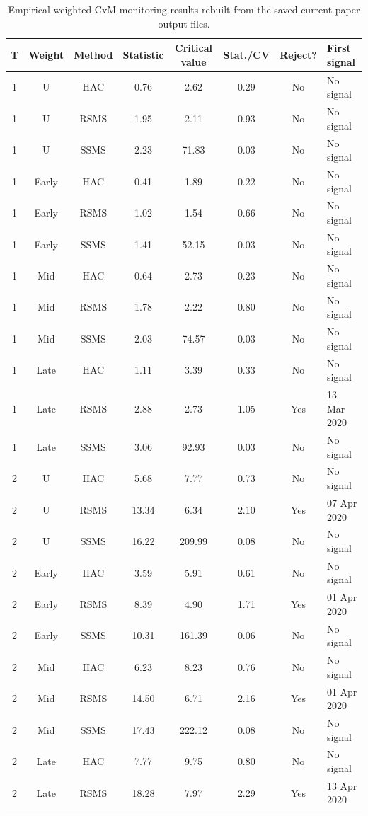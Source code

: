 \begin{table}[htbp]
\centering
\scriptsize
\caption{Empirical weighted-CvM monitoring results rebuilt from the saved current-paper output files.}
\label{tab:bundle-empirical-main-cvm}
\begin{tabular}{cccccccl}
\toprule
T & Weight & Method & Statistic & Critical value & Stat./CV & Reject? & First signal \\
\midrule
1 & U & HAC & 0.76 & 2.62 & 0.29 & No & No signal \\
1 & U & RSMS & 1.95 & 2.11 & 0.93 & No & No signal \\
1 & U & SSMS & 2.23 & 71.83 & 0.03 & No & No signal \\
1 & Early & HAC & 0.41 & 1.89 & 0.22 & No & No signal \\
1 & Early & RSMS & 1.02 & 1.54 & 0.66 & No & No signal \\
1 & Early & SSMS & 1.41 & 52.15 & 0.03 & No & No signal \\
1 & Mid & HAC & 0.64 & 2.73 & 0.23 & No & No signal \\
1 & Mid & RSMS & 1.78 & 2.22 & 0.80 & No & No signal \\
1 & Mid & SSMS & 2.03 & 74.57 & 0.03 & No & No signal \\
1 & Late & HAC & 1.11 & 3.39 & 0.33 & No & No signal \\
1 & Late & RSMS & 2.88 & 2.73 & 1.05 & Yes & 13 Mar 2020 \\
1 & Late & SSMS & 3.06 & 92.93 & 0.03 & No & No signal \\
2 & U & HAC & 5.68 & 7.77 & 0.73 & No & No signal \\
2 & U & RSMS & 13.34 & 6.34 & 2.10 & Yes & 07 Apr 2020 \\
2 & U & SSMS & 16.22 & 209.99 & 0.08 & No & No signal \\
2 & Early & HAC & 3.59 & 5.91 & 0.61 & No & No signal \\
2 & Early & RSMS & 8.39 & 4.90 & 1.71 & Yes & 01 Apr 2020 \\
2 & Early & SSMS & 10.31 & 161.39 & 0.06 & No & No signal \\
2 & Mid & HAC & 6.23 & 8.23 & 0.76 & No & No signal \\
2 & Mid & RSMS & 14.50 & 6.71 & 2.16 & Yes & 01 Apr 2020 \\
2 & Mid & SSMS & 17.43 & 222.12 & 0.08 & No & No signal \\
2 & Late & HAC & 7.77 & 9.75 & 0.80 & No & No signal \\
2 & Late & RSMS & 18.28 & 7.97 & 2.29 & Yes & 13 Apr 2020 \\

\end{tabular}
\end{table}
